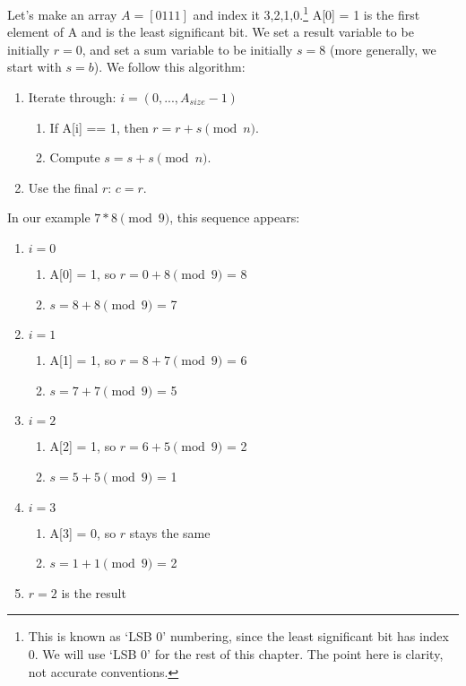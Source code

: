 Let's make an array $A = [0111]$ and index it 3,2,1,0.\footnote{This is known as `LSB 0' numbering, since the least significant bit has index 0. We will use `LSB 0' for the rest of this chapter. The point here is clarity, not accurate conventions.} A[0] = 1 is the first element of A and is the least significant bit. We set a result variable to be initially $r = 0$, and set a sum variable to be initially $s = 8$ (more generally, we start with $s = b$). We follow this algorithm:
\begin{enumerate}
	\item Iterate through: $i = (0,...,A_{size} - 1)$
	\begin{enumerate}
		\item If A[i] == 1, then $r = r + s \pmod n$.
		\item Compute $s = s + s \pmod n$.
	\end{enumerate}
	\item Use the final $r$: $c = r$.
\end{enumerate}

In our example $7*8 \pmod 9$, this sequence appears:
\begin{enumerate}
	\item $i = 0$
	\begin{enumerate}
		\item A[0] = 1, so $r = 0 + 8 \pmod 9$ = 8
		\item $s = 8 + 8 \pmod 9$ = 7
	\end{enumerate}
	\item $i = 1$
	\begin{enumerate}
		\item A[1] = 1, so $r = 8 + 7 \pmod 9$ = 6
		\item $s = 7 + 7 \pmod 9$ = 5
	\end{enumerate}
	\item $i = 2$
	\begin{enumerate}
		\item A[2] = 1, so $r = 6 + 5 \pmod 9$ = 2
		\item $s = 5 + 5 \pmod 9$ = 1
	\end{enumerate}
	\item $i = 3$
	\begin{enumerate}
		\item A[3] = 0, so $r$ stays the same
		\item $s = 1 + 1 \pmod 9$ = 2
	\end{enumerate}
	\item $r = 2$ is the result
\end{enumerate}


